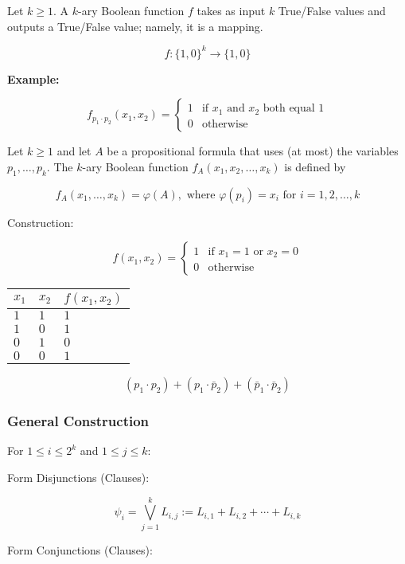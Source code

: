 \documentclass[12pt,a4paper,openany]{article}
\begin{document}
Let $k \geq 1$. A $k$-ary Boolean function $f$ takes as input
$k$ True/False values and outputs a True/False value; namely, it is a
mapping.

$$f : \{1, 0\}^k \rightarrow \{1, 0\}$$

\textbf{Example:}

$$f_{p_1 \cdot p_2}(x_1, x_2) = \begin{cases} 1 & \text{if } x_1 \text{ and } x_2 \text{ both equal } 1 \\ 0 & \text{otherwise} \end{cases}$$

Let $k \geq 1$ and let $A$ be a propositional formula that uses (at
most) the variables $p_1, \ldots, p_k$. The $k$-ary Boolean function
$f_A(x_1, x_2, \ldots, x_k)$ is defined by

$$f_A(x_1, \ldots, x_k) = \varphi(A), \text{ where } \varphi(p_i) = x_i \text{ for } i = 1, 2, \ldots, k$$

Construction:

$$f(x_1, x_2) = \begin{cases} 1 & \text{if } x_1 = 1 \text{ or } x_2 = 0 \\ 0 & \text{otherwise} \end{cases}$$

\begin{center}
\begin{tabular}{|l|l|l|}
\hline
$x_1$ & $x_2$ & $f(x_1, x_2)$ \\
\hline
$1$ & $1$ & $1$ \\
\hline
$1$ & $0$ & $1$ \\
\hline
$0$ & $1$ & $0$ \\
\hline
$0$ & $0$ & $1$ \\
\hline
\end{tabular}
\end{center}

$$(p_1 \cdot p_2) + (p_1 \cdot \bar p_2) + (\bar p_1 \cdot \bar p_2)$$

\subsubsection{General Construction}

For $1 \leq i \leq 2^k$ and $1 \leq j \leq k$:

Form Disjunctions (Clauses):

$$\psi_i = \displaystyle\bigvee_{j=1}^k L_{i,j} := L_{i,1} + L_{i,2} + \cdots + L_{i,k}$$

Form Conjunctions (Clauses):
\end{document}
